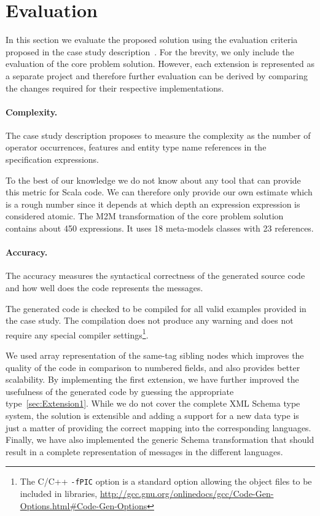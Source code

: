 
\section{Evaluation}
\label{sec:Evaluation}

In this section we evaluate the proposed solution using the evaluation criteria proposed in the case study description~\cite{Lano2014}.
For the brevity, we only include the evaluation of the core problem solution.
However, each extension is represented as a separate project and therefore further evaluation can be derived by comparing the changes required for their respective implementations.

\paragraph{Complexity.}

The case study description proposes to measure the complexity as the number of operator occurrences, features and entity type name references in the specification expressions.

To the best of our knowledge we do not know about any tool that can provide this metric for Scala code.
We can therefore only provide our own estimate which is a rough number since it depends at which depth an expression expression is considered atomic.
The M2M transformation of the core problem solution contains about 450 expressions. It uses 18 meta-models classes with 23 references.

\paragraph{Accuracy.}
%
The accuracy measures the syntactical correctness of the generated source code and how well does the code represents the \FIXML messages.

The generated code is checked to be compiled for all valid examples provided in the case study.
The compilation does not produce any warning and does not require any special compiler settings\footnote{The C/C++ \texttt{-fPIC} option is a standard option allowing the object files to be included in libraries, \Cf \url{http://gcc.gnu.org/onlinedocs/gcc/Code-Gen-Options.html\#Code-Gen-Options}}.

We used array representation of the same-tag sibling nodes which improves the quality of the code in comparison to numbered fields, and also provides better scalability.
By implementing the first extension, we have further improved the usefulness of the generated code by guessing the appropriate type~\ref{sec:Extension1}.
While we do not cover the complete XML Schema type system, the solution is extensible and adding a support for a new data type is just a matter of providing the correct mapping into the corresponding languages.
Finally, we have also implemented the generic \FIXML Schema transformation that should result in a complete representation of \FIXML messages in the different languages.

